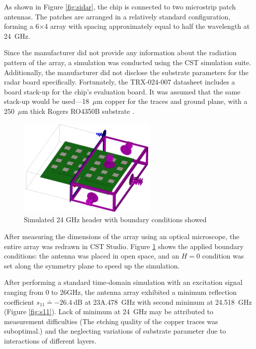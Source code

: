 As shown in Figure \ref{fig:sidar}, the chip is connected to two microstrip patch antennas.
The patches are arranged in a relatively standard configuration, forming a 6×4 array with spacing approximately equal to half the wavelength at 24~GHz.

Since the manufacturer did not provide any information about the radiation pattern of the array, a simulation was conducted using the CST simulation suite.
Additionally, the manufacturer did not disclose the substrate parameters for the radar board specifically.
Fortunately, the TRX-024-007 datasheet includes a board stack-up for the chip's evaluation board.
It was assumed that the same stack-up would be used—18~$\mu$m copper for the traces and ground plane, with a 250~$\mu$m thick Rogers RO4350B substrate \cite{sidarTRX24}.

\begin{figure}[ht!]
  \centering
  \includegraphics[width=0.6\textwidth]{../img/boundaries.png}
  \caption[Simulated 24 GHz header with boundary conditions showed]{Simulated 24 GHz header with boundary conditions showed}
  \label{fig:boundaries}
\end{figure}

After measuring the dimensions of the array using an optical microscope, the entire array was redrawn in CST Studio.
Figure \ref{fig:boundaries} shows the applied boundary conditions: the antenna was placed in open space, and an $H=0$ condition was set along the symmetry plane to speed up the simulation.

After performing a standard time-domain simulation with an excitation signal ranging from 0 to 26GHz, the antenna array exhibited a minimum reflection coefficient $s_{11} \doteq -26.4 \mathrm{~dB}$ at 23A.478~GHz with second minimum at 24.518~GHz (Figure \ref{fig:s11}).
Lack of minimum at 24~GHz may be attributed to measurement difficulties (The etching quality of the copper traces was suboptimal.) and the neglecting variations of substrate parameter due to interactions of different layers.

